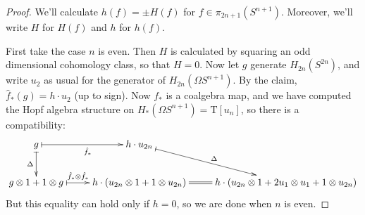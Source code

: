 \documentclass{article}
\begin{document}
\begin{proof}
We'll calculate $h(f)=\pm H(f)$ for $f\in\pi_{2n+1} (S^{n+1})$. Moreover, we'll write $H$ for $H(f)$ and $h$ for $h(f)$.

First take the case $n$ is even.  Then $H$ is calculated by squaring an odd dimensional cohomology class, so that $H = 0$. 
Now let $g$ generate $H_{2n}(S^{2n})$, and write $u_2$ as usual for the generator of $H_{2n}(\Omega S^{n+1})$. By the claim, $\hat f_*(g)=h\cdot u_2$ (up to sign). Now $f_*$ is a coalgebra map, and we have computed the Hopf algebra structure on $H_*(\Omega S^{n+1})=\mathrm{T}[u_n]$, so there is a compatibility:
\[\xymatrix{
g\ar@{|->}[r]_{\hat f_*}\ar@{|->}[d]_{\Delta}&h\cdot u_{2n}\ar@{|->}[dr]^{\Delta}\\
g\otimes1+1\otimes g\ar@{|->}[r]^{\hat f_*\otimes\hat f_*\qquad}&\ar@{=}[r]h\cdot(u_{2n}\otimes1+1\otimes u_{2n})&h\cdot(u_{2n}\otimes1+2u_1\otimes u_1+1\otimes u_{2n})
}\]
But this equality can hold only if $h = 0$, so we are done when $n$ is even.


\end{proof}
\end{document}
